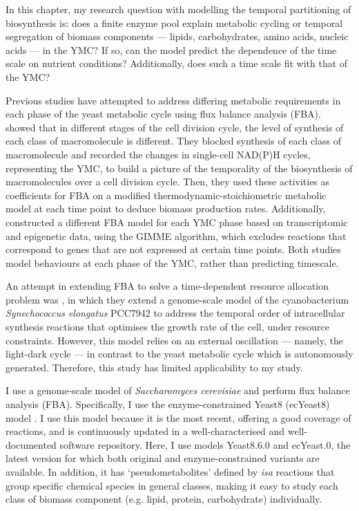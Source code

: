 In this chapter, my research question with modelling the temporal partitioning of biosynthesis is:
does a finite enzyme pool explain metabolic cycling or temporal segregation of biomass components --- lipids, carbohydrates, amino acids, nucleic acids --- in the YMC?
If so, can the model predict the dependence of the time scale on nutrient conditions?
Additionally, does such a time scale fit with that of the YMC?

Previous studies have attempted to address differing metabolic requirements in each phase of the yeast metabolic cycle using flux balance analysis (FBA).
\textcite{takhaveevTemporalSegregationBiosynthetic2023} showed that in different stages of the cell division cycle, the level of synthesis of each class of macromolecule is different.
They blocked synthesis of each class of macromolecule and recorded the changes in single-cell NAD(P)H cycles, representing the YMC, to build a picture of the temporality of the biosynthesis of macromolecules over a cell division cycle.
Then, they used these activities as coefficients for FBA on a modified thermodynamic-stoichiometric metabolic model at each time point to deduce biomass production rates.
Additionally, \textcite{cesurGenomeWideAnalysisYeast} constructed a different FBA model for each YMC phase based on transcriptomic and epigenetic data, using the GIMME algorithm, which excludes reactions that correspond to genes that are not expressed at certain time points.
Both studies model behaviours at each phase of the YMC, rather than predicting timescale.

An attempt in extending FBA to solve a time-dependent resource allocation problem was \textcite{reimersCellularTradeoffsOptimal2017}, in which they extend a genome-scale model of the cyanobacterium \textit{Synechococcus elongatus} PCC7942 to address the temporal order of intracellular synthesis reactions that optimises the growth rate of the cell, under resource constraints.
However, this model relies on an external oscillation --- namely, the light-dark cycle --- in contrast to the yeast metabolic cycle which is autonomously generated.
Therefore, this study has limited applicability to my study.

I use a genome-scale model of \textit{Saccharomyces cerevisiae} and perform flux balance analysis (FBA).
Specifically, I use the enzyme-constrained Yeast8 (ecYeast8) model \parencite{luConsensusCerevisiaeMetabolic2019}.
I use this model because it is the most recent, offering a good coverage of reactions, and is continuously updated in a well-characterised and well-documented software repository.
Here, I use models Yeast8.6.0 and ec\-Yeast.0, the latest version for which both original and enzyme-constrained variants are available.
In addition, it has `pseudometabolites' defined by \textit{isa} reactions \parencite{heavnerYeastExpandedReconstruction2012} that group specific chemical species in general classes, making it easy to study each class of biomass component (e.g. lipid, protein, carbohydrate) individually.

